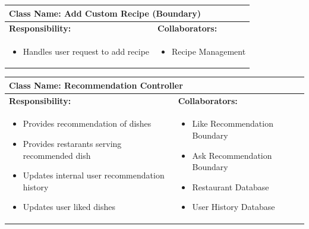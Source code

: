 \documentclass[]{article}
\begin{document}
\begin{table}[H]
	\centering
	\begin{tabular}{|p{7cm}|p{7cm}|}
	\hline 
	 \multicolumn{2}{|l|}{\textbf{Class Name:} Add Custom Recipe (Boundary)} \\
	\hline
	\textbf{Responsibility:} & \textbf{Collaborators:} \\
	\hline
	\raggedright
	\begin{itemize}
		\item Handles user request to add recipe
	\end{itemize}
	\vspace{1in} & 
	\begin{itemize}
		\item Recipe Management
	\end{itemize} \\
	\hline
	\end{tabular}
\end{table}


\begin{table}[H]
	\centering
	\begin{tabular}{|p{7cm}|p{7cm}|}
	\hline 
	 \multicolumn{2}{|l|}{\textbf{Class Name:} Recommendation Controller} \\
	\hline
	\textbf{Responsibility:} & \textbf{Collaborators:} \\
	\hline
	\raggedright
	\begin{itemize}
		\item Provides recommendation of dishes
		\item  Provides restarants serving recommended dish
		\item Updates internal user recommendation history
		\item Updates user liked dishes
	\end{itemize}
	\vspace{1in} & 
	\begin{itemize}
		\item Like Recommendation Boundary
		\item Ask Recommendation Boundary
		\item Restaurant Database
		\item User History Database
	\end{itemize} \\
	\hline
	\end{tabular}
\end{table}
\end{document}
